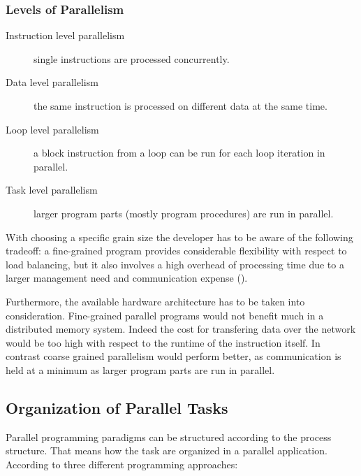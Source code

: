 \subsubsection{Levels of Parallelism}
\begin{description}
\item[Instruction level parallelism] single instructions are processed
  concurrently.
\item[Data level parallelism] the same instruction is processed on
  different data at the same time.
\item[Loop level parallelism] a block instruction from a loop can be
  run for each loop iteration in parallel.
\item[Task level parallelism] larger program parts (mostly
  program procedures) are run in parallel.
\end{description}

With choosing a specific grain size the developer has to be aware of
the following tradeoff: a fine-grained program provides considerable
flexibility with respect to load 
balancing, but it also involves 
a high overhead of processing time due to a larger management need and
communication expense (\cite{sevcikova04simulations}).

Furthermore, the available hardware architecture has to be taken
into consideration. Fine-grained parallel programs would not benefit
much in a distributed memory system. Indeed the cost for transfering
data over the network would be too high with respect to the runtime of
the instruction itself. In contrast coarse grained parallelism would
perform better, as communication is held at a minimum as larger
program parts are run in parallel.

\subsection{Organization of Parallel Tasks}

Parallel programming paradigms can be structured according to the
process structure. That means how the task are organized in a parallel
application. According to \cite{geist94pvm} three different
programming approaches:

